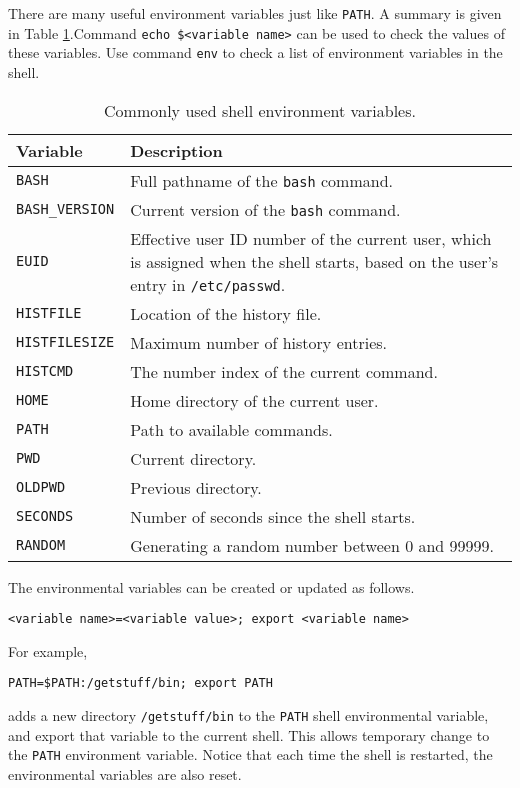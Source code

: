 There are many useful environment variables just like \verb|PATH|. A summary is given in Table \ref{ch:sb:tab:shellenvironmentvars}.Command \verb|echo $<variable name>| can be used to check the values of these variables. Use command \verb|env| to check a list of environment variables in the shell.

\begin{table}[!htb]
	\centering \caption{Commonly used shell environment variables.}\label{ch:sb:tab:shellenvironmentvars}
	\begin{tabularx}{\textwidth}{lX}
		\hline
		Variable & Description \\ \hline
		\verb|BASH| & Full pathname of the \verb|bash| command. \\ 
		\verb|BASH_VERSION| & Current version of the \verb|bash| command. \\ 
		\verb|EUID| & Effective user ID number of the current user, which is assigned when the shell starts, based on the user's entry in \verb|/etc/passwd|. \\ 
		\verb|HISTFILE| & Location of the history file. \\ 
		\verb|HISTFILESIZE| & Maximum number of history entries. \\ 
		\verb|HISTCMD| & The number index of the current command. \\ 
		\verb|HOME| & Home directory of the current user. \\ 
		\verb|PATH| & Path to available commands. \\ 
		\verb|PWD| & Current directory. \\ 
		\verb|OLDPWD| & Previous directory. \\ 
		\verb|SECONDS| & Number of seconds since the shell starts. \\ 
		\verb|RANDOM| & Generating a random number between 0 and 99999. \\
		\hline
	\end{tabularx}
\end{table}

The environmental variables can be created or updated as follows.
\begin{lstlisting}
<variable name>=<variable value>; export <variable name>
\end{lstlisting}
For example,
\begin{lstlisting}
PATH=$PATH:/getstuff/bin; export PATH
\end{lstlisting}
adds a new directory \verb|/getstuff/bin| to the \verb|PATH| shell environmental variable, and export that variable to the current shell. This allows temporary change to the \verb|PATH| environment variable. Notice that each time the shell is restarted, the environmental variables are also reset. 

